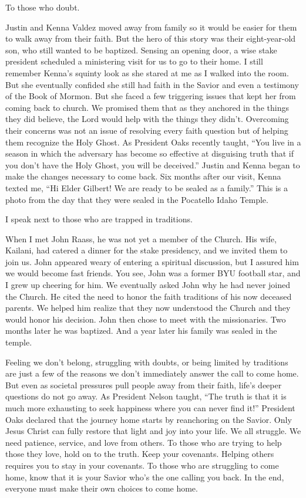 \documentclass[letterpaper, 11pt]{report}
\newcommand{\intalkheader}[1]{
    \vspace{0.75em}
    \noindent{\normalsize\bfseries #1}
    \par\nopagebreak %
    \vspace{0.25em}
    \nopagebreak     %
}
\begin{document}
To those who doubt.

Justin and Kenna Valdez moved away from family so it would be easier for them to walk away from their faith. But the hero of this story was their eight-year-old son, who still wanted to be baptized. Sensing an opening door, a wise stake president scheduled a ministering visit for us to go to their home. I still remember Kenna’s squinty look as she stared at me as I walked into the room. But she eventually confided she still had faith in the Savior and even a testimony of the Book of Mormon. But she faced a few triggering issues that kept her from coming back to church. We promised them that as they anchored in the things they did believe, the Lord would help with the things they didn’t. Overcoming their concerns was not an issue of resolving every faith question but of helping them recognize the Holy Ghost. As President Oaks recently taught, “You live in a season in which the adversary has become so effective at disguising truth that if you don’t have the Holy Ghost, you will be deceived.” Justin and Kenna began to make the changes necessary to come back. Six months after our visit, Kenna texted me, “Hi Elder Gilbert! We are ready to be sealed as a family.” This is a photo from the day that they were sealed in the Pocatello Idaho Temple.

I speak next to those who are trapped in traditions.

When I met John Raass, he was not yet a member of the Church. His wife, Kailani, had catered a dinner for the stake presidency, and we invited them to join us. John appeared weary of entering a spiritual discussion, but I assured him we would become fast friends. You see, John was a former BYU football star, and I grew up cheering for him. We eventually asked John why he had never joined the Church. He cited the need to honor the faith traditions of his now deceased parents. We helped him realize that they now understood the Church and they would honor his decision. John then chose to meet with the missionaries. Two months later he was baptized. And a year later his family was sealed in the temple.

\intalkheader{Conclusion}

Feeling we don’t belong, struggling with doubts, or being limited by traditions are just a few of the reasons we don’t immediately answer the call to come home. But even as societal pressures pull people away from their faith, life’s deeper questions do not go away. As President Nelson taught, “The truth is that it is much more exhausting to seek happiness where you can never find it!” President Oaks declared that the journey home starts by reanchoring on the Savior. Only Jesus Christ can fully restore that light and joy into your life. We all struggle. We need patience, service, and love from others. To those who are trying to help those they love, hold on to the truth. Keep your covenants. Helping others requires you to stay in your covenants. To those who are struggling to come home, know that it is your Savior who’s the one calling you back. In the end, everyone must make their own choices to come home.
\end{document}
